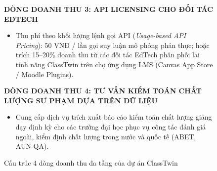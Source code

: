 \begin{figure}[htbp]
\begin{tcolorbox}[colback=LightBg, colframe=NavyBlue, boxrule=1pt, arc=4pt, width=0.98\textwidth]
\begin{itemize}[leftmargin=1.5em]
    \end{itemize}
    \vspace{1mm}
    \textbf{DÒNG DOANH THU 3: API LICENSING CHO ĐỐI TÁC EDTECH}
    \begin{itemize}[leftmargin=1.5em]
      \item Thu phí theo khối lượng lệnh gọi API (\textit{Usage-based API Pricing}): 50 VNĐ / lần gọi suy luận mô phỏng phản thực; hoặc trích 15--20\% doanh thu từ các đối tác EdTech phân phối lại tính năng ClassTwin trên chợ ứng dụng LMS (Canvas App Store / Moodle Plugins).
    \end{itemize}
    \vspace{1mm}
    \textbf{DÒNG DOANH THU 4: TƯ VẤN KIỂM TOÁN CHẤT LƯỢNG SƯ PHẠM DỰA TRÊN DỮ LIỆU}
    \begin{itemize}[leftmargin=1.5em]
      \item Cung cấp dịch vụ trích xuất báo cáo kiểm toán chất lượng giảng dạy định kỳ cho các trường đại học phục vụ công tác đánh giá ngoài, kiểm định chất lượng trong nước và quốc tế (ABET, AUN-QA).
    \end{itemize}
  \end{tcolorbox}
  \caption{Cấu trúc 4 dòng doanh thu đa tầng của dự án ClassTwin}\label{fig:revenue-model}
\end{figure}

